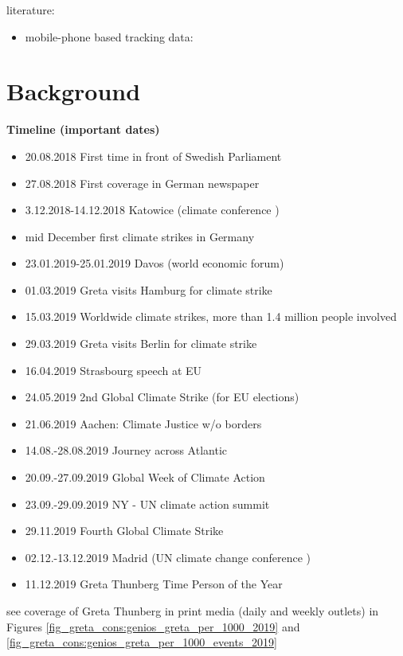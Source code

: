 literature: 
\begin{itemize}
	\item mobile-phone based tracking data: \cite{dave2020contagion}
\end{itemize}



\bigskip
\section{Background}\label{sec_greta_cons:background}



\textbf{Timeline (important dates)}
\begin{itemize}
	\item 20.08.2018 First time in front of Swedish Parliament
	\item 27.08.2018 First coverage in German newspaper
	\item 3.12.2018-14.12.2018 Katowice (climate conference )
	\item mid December first climate strikes in Germany
	\item 23.01.2019-25.01.2019 Davos (world economic forum)
	\item 01.03.2019 Greta visits Hamburg for climate strike
	\item 15.03.2019 Worldwide climate strikes, more than 1.4 million people involved
	\item 29.03.2019 Greta visits Berlin for climate strike
	\item 16.04.2019 Strasbourg speech at EU
	\item 24.05.2019 2nd Global Climate Strike (for EU elections)
	\item 21.06.2019 Aachen: Climate Justice w/o borders
	\item 14.08.-28.08.2019 Journey across Atlantic 
	\item 20.09.-27.09.2019 Global Week of Climate Action
	\item 23.09.-29.09.2019 NY - UN climate action summit
	\item 29.11.2019 Fourth Global Climate Strike
	\item 02.12.-13.12.2019 Madrid (UN climate change conference )
	\item 11.12.2019 Greta Thunberg Time Person of the Year	
\end{itemize}
see coverage of Greta Thunberg in print media (daily and weekly outlets) in Figures \ref{fig_greta_cons:genios_greta_per_1000_2019} and \ref{fig_greta_cons:genios_greta_per_1000_events_2019}





